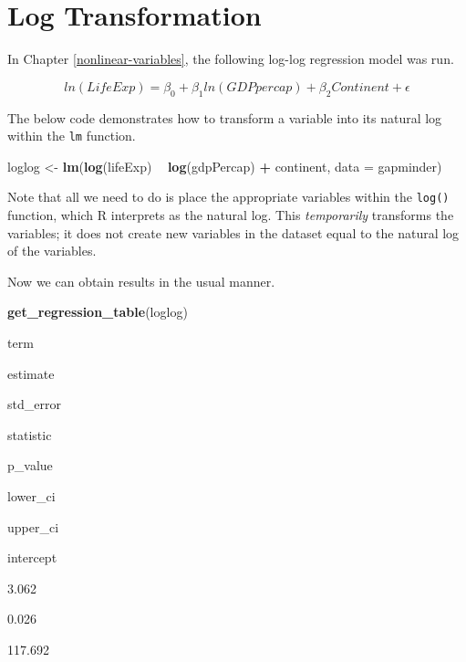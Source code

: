 \documentclass[
]{book}
\newenvironment{Shaded}{\begin{snugshade}}{\end{snugshade}}
\newcommand{\DataTypeTok}[1]{\textcolor[rgb]{0.13,0.29,0.53}{#1}}
\newcommand{\KeywordTok}[1]{\textcolor[rgb]{0.13,0.29,0.53}{\textbf{#1}}}
\newcommand{\NormalTok}[1]{#1}
\newcommand{\OperatorTok}[1]{\textcolor[rgb]{0.81,0.36,0.00}{\textbf{#1}}}
\newcommand{\StringTok}[1]{\textcolor[rgb]{0.31,0.60,0.02}{#1}}
\begin{document}
\hypertarget{log-transformation}{%
\section{Log Transformation}\label{log-transformation}}

In Chapter \ref{nonlinear-variables}, the following log-log regression model was run.

\begin{equation}
ln(LifeExp)=\beta_0 + \beta_1ln(GDPpercap) + \beta_2Continent + \epsilon
\end{equation}

The below code demonstrates how to transform a variable into its natural log within the \texttt{lm} function.

\begin{Shaded}
\begin{Highlighting}[]
\NormalTok{loglog <-}\StringTok{ }\KeywordTok{lm}\NormalTok{(}\KeywordTok{log}\NormalTok{(lifeExp) }\OperatorTok{~}\StringTok{ }\KeywordTok{log}\NormalTok{(gdpPercap) }\OperatorTok{+}\StringTok{ }\NormalTok{continent, }\DataTypeTok{data =}\NormalTok{ gapminder)}
\end{Highlighting}
\end{Shaded}

Note that all we need to do is place the appropriate variables within the \texttt{log()} function, which R interprets as the natural log. This \emph{temporarily} transforms the variables; it does not create new variables in the dataset equal to the natural log of the variables.

Now we can obtain results in the usual manner.

\begin{Shaded}
\begin{Highlighting}[]
\KeywordTok{get_regression_table}\NormalTok{(loglog)}
\end{Highlighting}
\end{Shaded}

term

estimate

std\_error

statistic

p\_value

lower\_ci

upper\_ci

intercept

3.062

0.026

117.692
\end{document}
